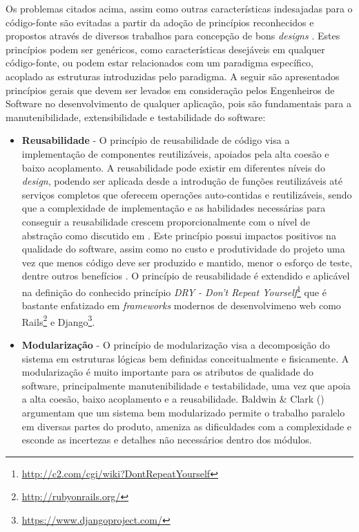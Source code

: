 %

Os problemas citados acima, assim como outras características indesajadas para o código-fonte são evitadas a partir da adoção de princípios reconhecidos e propostos através de diversos trabalhos para concepção de bons \emph{designs} \cite{martin2002} \cite{lakos1996} \cite{demeyer2002} \cite{lieberherr1996}. Estes princípios podem ser genéricos, como características desejáveis em qualquer código-fonte, ou podem estar relacionados com um paradigma específico, acoplado as estruturas introduzidas pelo paradigma. 	 A seguir são apresentados princípios gerais que devem ser levados em consideração pelos Engenheiros de Software no desenvolvimento de qualquer aplicação, pois são fundamentais para a manutenibilidade, extensibilidade e testabilidade do software:

\begin{itemize}
\item \textbf{Reusabilidade} - O princípio de reusabilidade de código visa a implementação de componentes reutilizáveis, apoiados pela alta coesão e baixo acoplamento. A reusabilidade pode existir em diferentes níveis do \emph{design}, podendo ser aplicada desde a introdução de funções reutilizáveis até serviços completos que oferecem operações auto-contidas e reutilizáveis, sendo que a complexidade de implementação e as habilidades necessárias para conseguir a reusabilidade crescem proporcionalmente com o nível de abstração como discutido em \cite{cruise2007}. Este princípio possui impactos positivos na qualidade do software, assim como no custo e produtividade do projeto uma vez que menos código deve ser produzido e mantido, menor o esforço de teste, dentre outros benefícios \cite{sametinger1997}. O princípio de reusabilidade é extendido e aplicável na definição do conhecido princípio \emph{DRY - Don't Repeat Yourself}\footnote{\url{http://c2.com/cgi/wiki?DontRepeatYourself}} que é bastante enfatizado em \emph{frameworks} modernos de desenvolvimeno web como Rails\footnote{\url{http://rubyonrails.org/}} e Django\footnote{\url{https://www.djangoproject.com/}}.
\item \textbf{Modularização} - O princípio de modularização visa a decomposição do sistema em estruturas lógicas bem definidas conceitualmente e fisicamente. A modularização é muito importante para os atributos de qualidade do software, principalmente manutenibilidade e testabilidade, uma vez que apoia a alta coesão, baixo acoplamento e a reusabilidade. Baldwin \& Clark (\citeyear{baldwin2000}) argumentam que um sistema bem modularizado permite o trabalho paralelo em diversas partes do produto, ameniza as dificuldades com a complexidade e esconde as incertezas e detalhes não necessários dentro dos módulos.

\end{itemize}
